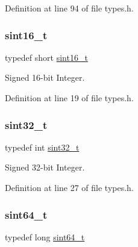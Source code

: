 Definition at line 94 of file types.\+h.

\mbox{\label{a00116_a5881659ed80e940350d12831204375cd_a5881659ed80e940350d12831204375cd}} 
\subsubsection{\texorpdfstring{sint16\+\_\+t}{sint16\_t}}
{\footnotesize\ttfamily typedef short \hyperlink{a00116_a5881659ed80e940350d12831204375cd_a5881659ed80e940350d12831204375cd}{sint16\+\_\+t}}



Signed 16-\/bit Integer. 



Definition at line 19 of file types.\+h.

\mbox{\label{a00116_ad838970452fe561cb8e0550cac5336be_ad838970452fe561cb8e0550cac5336be}} 
\subsubsection{\texorpdfstring{sint32\+\_\+t}{sint32\_t}}
{\footnotesize\ttfamily typedef int \hyperlink{a00116_ad838970452fe561cb8e0550cac5336be_ad838970452fe561cb8e0550cac5336be}{sint32\+\_\+t}}



Signed 32-\/bit Integer. 



Definition at line 27 of file types.\+h.

\mbox{\label{a00116_a04761b9e7480e1e48b0d392da17fd5d4_a04761b9e7480e1e48b0d392da17fd5d4}} 
\subsubsection{\texorpdfstring{sint64\+\_\+t}{sint64\_t}}
{\footnotesize\ttfamily typedef long \hyperlink{a00116_a04761b9e7480e1e48b0d392da17fd5d4_a04761b9e7480e1e48b0d392da17fd5d4}{sint64\+\_\+t}}



